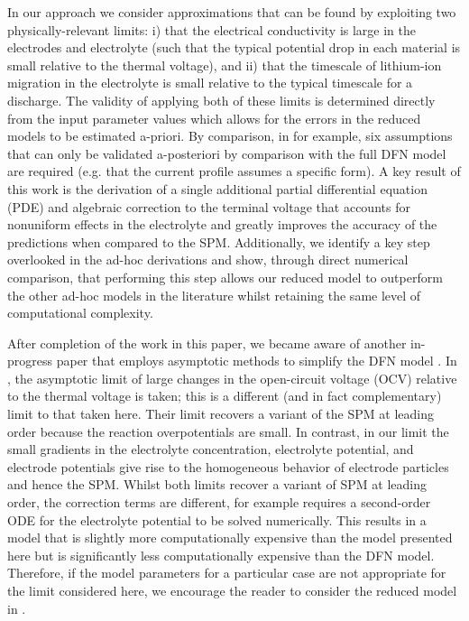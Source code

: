 \documentclass[a4paper]{article}
\begin{document}
In our approach we consider approximations that can be found by exploiting two physically-relevant limits: i) that the electrical conductivity is large in the electrodes and electrolyte (such that the typical potential drop in each material is small relative to the thermal voltage), and ii) that the timescale of lithium-ion migration in the electrolyte is small relative to the typical timescale for a discharge. The validity of applying both of these limits is determined directly from the input parameter values which allows for the errors in the reduced models to be estimated a-priori. By comparison, in \cite{Moura2017} for example, six assumptions that can only be validated a-posteriori by comparison with the full DFN model are required (e.g. that the current profile assumes a specific form). A key result of this work is the derivation of a single additional partial differential equation (PDE) and algebraic correction to the terminal voltage that accounts for nonuniform effects in the electrolyte and greatly improves the accuracy of the predictions when compared to the SPM. Additionally, we identify a key step overlooked in the ad-hoc derivations and show, through direct numerical comparison, that performing this step allows our reduced model to outperform the other ad-hoc models in the literature whilst retaining the same level of computational complexity.

After completion of the work in this paper, we became aware of another in-progress paper that employs asymptotic methods to simplify the DFN model \cite{foster2019}. In \cite{foster2019}, the asymptotic limit of large changes in the open-circuit voltage (OCV) relative to the thermal voltage is taken; this is a different (and in fact complementary) limit to that taken here. Their limit recovers a variant of the SPM at leading order because the reaction overpotentials are small. In contrast, in our limit the small gradients in the electrolyte concentration, electrolyte potential, and  electrode potentials give rise to the homogeneous behavior of electrode particles and hence the SPM. Whilst both limits recover a variant of SPM at leading order, the correction terms are different, for example \cite{foster2019} requires a second-order ODE for the electrolyte potential to be solved numerically. This results in a model that is slightly more computationally expensive than the model presented here but is significantly less computationally expensive than the DFN model. Therefore, if the model parameters for a particular case are not appropriate for the limit considered here, we encourage the reader to consider the reduced model in \cite{foster2019}.
\end{document}
